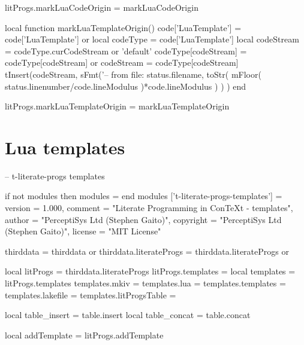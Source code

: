 litProgs.markLuaCodeOrigin = markLuaCodeOrigin

local function markLuaTemplateOrigin()
  code['LuaTemplate']  = code['LuaTemplate'] or { }
  local codeType       = code['LuaTemplate']
  local codeStream     = codeType.curCodeStream or 'default'
  codeType[codeStream] = codeType[codeStream] or { }
  codeStream           = codeType[codeStream]
  tInsert(codeStream,
    sFmt('-- from file: %
      status.filename,
      toStr(
        mFloor(
          status.linenumber/code.lineModulus
        )*code.lineModulus
      )
    )
  )
end

litProgs.markLuaTemplateOrigin = markLuaTemplateOrigin
\stopLuaCode

\setLitProgsOriginMarker[MkIVCode][markMkIVCodeOrigin]
\setLitProgsOriginMarker[LuaCode][markLuaCodeOrigin]
\setLitProgsOriginMarker[LuaTemplate][markLuaTemplateOrigin]

\section{Lua templates}

\startLuaTemplate
-- t-literate-progs templates

if not modules then modules = { } end
modules ['t-literate-progs-templates'] = {
    version   = 1.000,
    comment   = "Literate Programming in ConTeXt - templates",
    author    = "PerceptiSys Ltd (Stephen Gaito)",
    copyright = "PerceptiSys Ltd (Stephen Gaito)",
    license   = "MIT License"
}

thirddata               = thirddata               or {}
thirddata.literateProgs = thirddata.literateProgs or {}

local litProgs          = thirddata.literateProgs
litProgs.templates      = {}
local templates         = litProgs.templates
templates.mkiv          = {}
templates.lua           = {}
templates.templates     = {}
templates.lakefile      = {}
templates.litProgsTable = {}

local table_insert = table.insert
local table_concat = table.concat

local addTemplate = litProgs.addTemplate
\stopLuaTemplate


\stopchapter